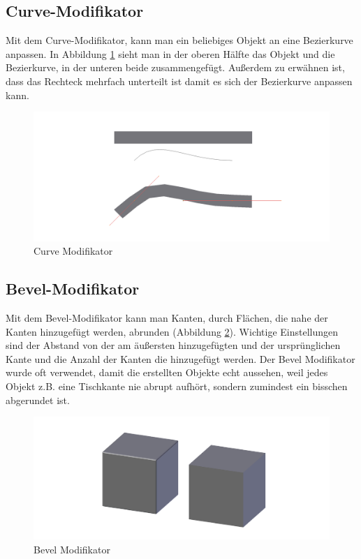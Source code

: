 \subsection{Curve-Modifikator}\citep{blender:curve_modifier}
\label{Curve:heading}
Mit dem Curve-Modifikator, kann man ein beliebiges Objekt an eine Bezierkurve anpassen. In Abbildung \ref{modifikatoren:image4} sieht man
in der oberen Hälfte das Objekt und die Bezierkurve, in der unteren beide zusammengefügt.
Außerdem zu erwähnen ist, dass das Rechteck mehrfach unterteilt ist damit es sich der Bezierkurve anpassen kann.
\begin{figure}[h]
    \centering
    \includegraphics[width=.8\textwidth]{images/Modifikatoren-Curve.png}
    \caption{Curve Modifikator}
    \label{modifikatoren:image4}
\end{figure}

\subsection{Bevel-Modifikator}\citep{blender:bevel_modifier}
\label{Bevel:heading}
Mit dem Bevel-Modifikator kann man Kanten, durch Flächen, die nahe der Kanten hinzugefügt werden, abrunden (Abbildung \ref{modifikatoren:image5}).
Wichtige Einstellungen sind der Abstand von der am äußersten hinzugefügten und der ursprünglichen Kante und die Anzahl der Kanten die hinzugefügt werden.
Der Bevel Modifikator wurde oft verwendet, damit die erstellten Objekte echt aussehen, weil jedes Objekt z.B. eine Tischkante nie abrupt
aufhört, sondern zumindest ein bisschen abgerundet ist.
\begin{figure}[h]
    \centering
    \includegraphics[width=.8\textwidth]{images/Modifikatoren-Bevel.png}
    \caption{Bevel Modifikator}
    \label{modifikatoren:image5}
\end{figure}

